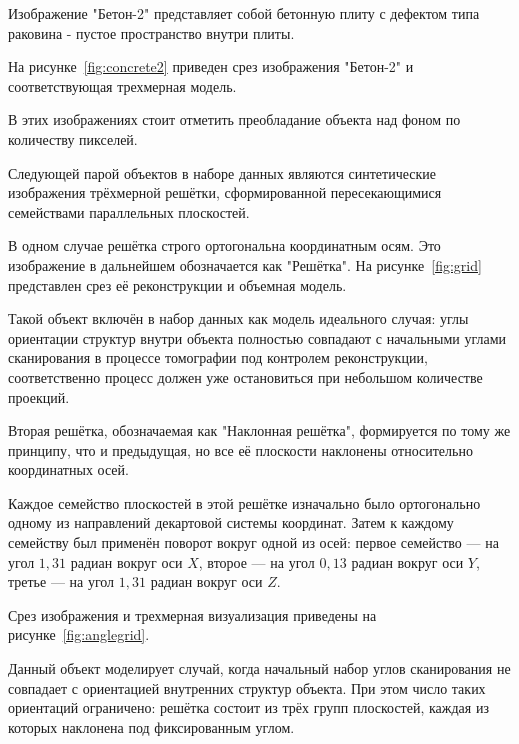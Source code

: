 
Изображение "Бетон-2" представляет собой бетонную плиту с дефектом типа раковина - пустое пространство внутри плиты.

На рисунке~\ref{fig:concrete2} приведен срез изображения  "Бетон-2" и соответствующая трехмерная модель.



В этих изображениях стоит отметить преобладание объекта над фоном по количеству пикселей.

Следующей парой объектов в наборе данных являются синтетические изображения трёхмерной решётки, сформированной пересекающимися семействами параллельных плоскостей. 

В одном случае решётка строго ортогональна координатным осям. Это изображение в дальнейшем обозначается как "Решётка". На рисунке~\ref{fig:grid} представлен срез её реконструкции и объемная модель.

Такой объект включён в набор данных как модель идеального случая: углы ориентации структур внутри объекта полностью совпадают с начальными углами сканирования в процессе томографии под контролем реконструкции, соответственно процесс должен уже остановиться при небольшом количестве проекций.


Вторая решётка, обозначаемая как "Наклонная решётка", формируется по тому же принципу, что и предыдущая, но все её плоскости наклонены относительно координатных осей.

Каждое семейство плоскостей в этой решётке изначально было ортогонально одному из направлений декартовой системы координат. Затем к каждому семейству был применён поворот вокруг одной из осей: первое семейство — на угол \(1{,}31\) радиан вокруг оси \(X\), второе — на угол \(0{,}13\) радиан вокруг оси \(Y\), третье — на угол \(1{,}31\) радиан вокруг оси \(Z\).

Срез изображения и трехмерная визуализация приведены на рисунке~\ref{fig:anglegrid}.

Данный объект моделирует случай, когда начальный набор углов сканирования не совпадает с ориентацией внутренних структур объекта. При этом число таких ориентаций ограничено: решётка состоит из трёх групп плоскостей, каждая из которых наклонена под фиксированным углом.

